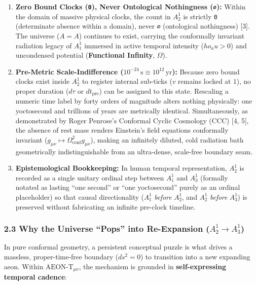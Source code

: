 \documentclass[
]{article}
\providecommand{\tightlist}{%
  \setlength{\itemsep}{0pt}\setlength{\parskip}{0pt}}
\begin{document}
\begin{enumerate}
\def\labelenumi{\arabic{enumi}.}
\tightlist
\item
  \textbf{Zero Bound Clocks (\texttt{0}), Never Ontological Nothingness
  (\texttt{∅}):} Within the domain of massive physical clocks, the count
  in \(A_2^1\) is strictly \texttt{0} (determinate absence within a
  domain), never \texttt{∅} (ontological nothingness) {[}3{]}. The
  universe (\(A = A\)) continues to exist, carrying the conformally
  invariant radiation legacy of \(A_1^1\) immersed in active temporal
  intensity (\(ho_   au > 0\)) and uncondensed potential
  (\textbf{Functional Infinity}, \(\Omega\)).
\item
  \textbf{Pre-Metric Scale-Indifference
  (\(10^{-24}\,\mathrm{s} \equiv 10^{12}\,\mathrm{yr}\)):} Because zero
  bound clocks exist inside \(A_2^1\) to register internal sub-ticks
  (\(v\) remains locked at \(1\)), no proper duration (\(d\tau\) or
  \(dt_{\mathrm{pre}}\)) can be assigned to this state. Rescaling a
  numeric time label by forty orders of magnitude alters nothing
  physically: one yoctosecond and trillions of years are metrically
  identical. Simultaneously, as demonstrated by Roger Penrose's
  Conformal Cyclic Cosmology (CCC) {[}4, 5{]}, the absence of rest mass
  renders Einstein's field equations conformally invariant
  (\(g_{\mu\nu} \mapsto \Omega_{\mathrm{conf}}^2 g_{\mu\nu}\)), making
  an infinitely diluted, cold radiation bath geometrically
  indistinguishable from an ultra-dense, scale-free boundary seam.
\item
  \textbf{Epistemological Bookkeeping:} In human temporal
  representation, \(A_2^1\) is recorded as a single unitary ordinal step
  between \(A_1^1\) and \(A_3^1\) (formally notated as lasting ``one
  second'' or ``one yoctosecond'' purely as an ordinal placeholder) so
  that causal directionality (\(A_1^1\) \emph{before} \(A_2^1\), and
  \(A_2^1\) \emph{before} \(A_3^1\)) is preserved without fabricating an
  infinite pre-clock timeline.
\end{enumerate}

\subsubsection{\texorpdfstring{2.3 Why the Universe ``Pops'' into
Re-Expansion
(\(A_2^1 \to A_3^1\))}{2.3 Why the Universe ``Pops'' into Re-Expansion (A\_2\^{}1 \textbackslash to A\_3\^{}1)}}\label{why-the-universe-pops-into-re-expansion-a_21-to-a_31}

In pure conformal geometry, a persistent conceptual puzzle is what
drives a massless, proper-time-free boundary (\(ds^2 = 0\)) to
transition into a new expanding aeon. Within \(\text{AEON-T}_{\mu\nu}\),
the mechanism is grounded in \textbf{self-expressing temporal cadence}:
\end{document}
